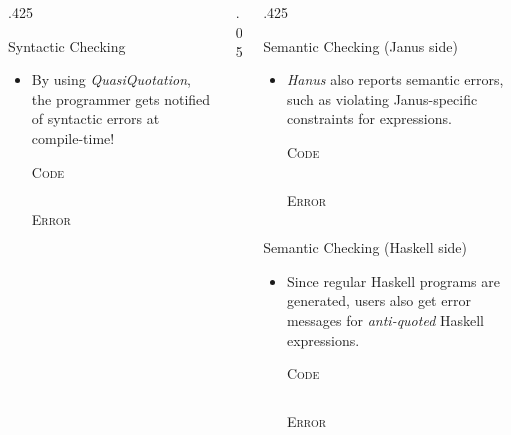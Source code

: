 \documentclass[final,hyperref={pdfpagelabels=false}]{beamer}
\newcommand\sepsize{.05\textwidth}
\newcommand\colsize{.425\textwidth}
\newcommand{\code}[2]{
	\begin{center}
		\vspace{.5cm}
		\textsc{\small #1}\\
		\vspace{.5cm}
	\end{center}
	\begin{minipage}{.9\textwidth}
		\inputminted[frame=lines,framesep=1cm,baselinestretch=.8,linenos,fontsize=\footnotesize]
			{haskell}{code/#2.hs}
	\end{minipage}
}
\newcommand{\codeErr}[1]{
	\begin{center}
		\vspace{.5cm}
		\textsc{\small Error}\\
		\vspace{.5cm}
	\end{center}
	\begin{minipage}{.9\textwidth}
		\inputminted[frame=lines,framesep=1cm,baselinestretch=.8,fontsize=\footnotesize]
			{bash}{code/#1_err.hs}
	\end{minipage}
}
\begin{document}
\begin{frame}[t]
\begin{columns}[t]
\begin{column}{\colsize}
\begin{block}{Syntactic Checking}
	\begin{itemize}
	\item By using \textit{QuasiQuotation}, the programmer gets notified of syntactic errors at compile-time!
		\code{Code}{syntax}
		\vspace{1cm}
		\codeErr{syntax}
	\end{itemize}
\end{block}


\end{column} %

\begin{column}{\sepsize}\end{column} %

\begin{column}{\colsize} %


\begin{block}{Semantic Checking (Janus side)}
	\begin{itemize}
	\item \textit{Hanus} also reports semantic errors, such as violating Janus-specific constraints for expressions.
		\code{Code}{semJ}
		\vspace{1cm}
		\codeErr{semJ}
	\end{itemize}
\end{block}

\begin{block}{Semantic Checking (Haskell side)}
	\begin{itemize}
	\item Since regular Haskell programs are generated, users also get error messages for \textit{anti-quoted} Haskell expressions.
		\code{Code}{semH}
		\vspace{1cm}
		\codeErr{semH}
	\end{itemize}
\end{block}


\end{column}
\end{columns}
\end{frame}
\end{document}

